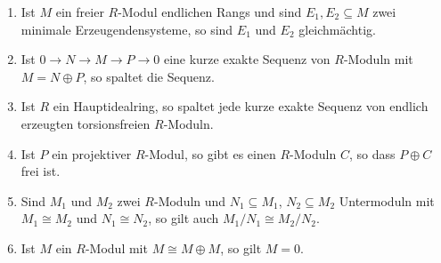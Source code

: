 \begin{question}[subtitle = Wahr oder Falsch?]
\begin{enumerate}
    \item
      Ist $M$ ein freier $R$-Modul endlichen Rangs und sind $E_1, E_2 \subseteq M$ zwei minimale Erzeugendensysteme, so sind $E_1$ und $E_2$ gleichmächtig.
    \item
      Ist $0 \to N \to M \to P \to 0$ eine kurze exakte Sequenz von $R$-Moduln mit $M = N \oplus P$, so spaltet die Sequenz.
    \item
      Ist $R$ ein Hauptidealring, so spaltet jede kurze exakte Sequenz von endlich erzeugten torsionsfreien $R$-Moduln.
    \item
      Ist $P$ ein projektiver $R$-Modul, so gibt es einen $R$-Moduln $C$, so dass $P \oplus C$ frei ist.
    \item
      Sind $M_1$ und $M_2$ zwei $R$-Moduln und $N_1 \subseteq M_1$, $N_2 \subseteq M_2$ Untermoduln mit $M_1 \cong M_2$ und $N_1 \cong N_2$, so gilt auch $M_1/N_1 \cong M_2/N_2$.
    \item
      Ist $M$ ein $R$-Modul mit $M \cong M \oplus M$, so gilt $M = 0$.
  \end{enumerate}
\end{question}


